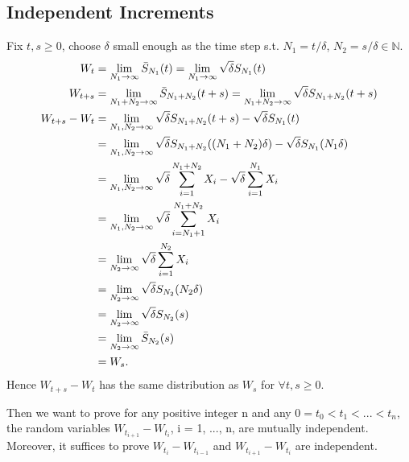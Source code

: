 \subsection{Independent Increments}
Fix $ t,s \geq 0$, choose $\delta$ small enough as the time step s.t. $N_1=t/\delta$, $N_2=s/\delta\in \mathbb{N}$.
\begin{align}
   W_t&=\lim_{N_1\rightarrow \infty} \bar{S}_{N_1}(t)=\lim_{N_1\rightarrow \infty} \sqrt{\delta} S_{N_1}(t)\\
   W_{t+s}&=\lim_{N_1+N_2\rightarrow \infty} \bar{S}_{N_1+N_2}(t+s)=\lim_{N_1+N_2\rightarrow \infty} \sqrt{\delta} S_{N_1+N_2}(t+s)\\
   W_{t+s}-W_t&=\lim_{N_1,N_2\rightarrow \infty} \sqrt{\delta} S_{N_1+N_2}(t+s)-\sqrt{\delta} S_{N_1}(t)\\\notag
   &=\lim_{N_1,N_2\rightarrow \infty} \sqrt{\delta} S_{N_1+N_2}((N_1+N_2)\delta)-\sqrt{\delta} S_{N_1}(N_1\delta)\\\notag
   &=\lim_{N_1,N_2\rightarrow \infty} \sqrt{\delta} \sum_{i=1}^{N_1+N_2} X_i-\sqrt{\delta} \sum_{i=1}^{N_1} X_i\\\notag
   &=\lim_{N_1,N_2\rightarrow \infty} \sqrt{\delta} \sum_{i=N_1+1}^{N_1+N_2} X_i\\\notag
   &=\lim_{N_2\rightarrow \infty} \sqrt{\delta} \sum_{i=1}^{N_2} X_i\\\notag
   &=\lim_{N_2\rightarrow \infty} \sqrt{\delta} S_{N_2}(N_2\delta)\\\notag\
   &=\lim_{N_2\rightarrow \infty} \sqrt{\delta} S_{N_2}(s)\\\notag
   &=\lim_{N_2\rightarrow \infty} \bar{S}_{N_2}(s)\\\notag
   &=W_s.
\end{align}
Hence $W_{t+s}-W_t$  has the same distribution as $W_s$ for $\forall t,s \geq 0$.

Then we want to prove for any positive integer n and any $0 = t_0 < t_1 <...< t_n$, the random variables $W_{t_{i+1}} - W_{t_{i}}$, i = 1, ..., n, are mutually independent. Moreover, it suffices to prove $W_{t_{i}}-W_{t_{i-1}}$ and $W_{t_{i+1}}-W_{t_{i}}$ are independent.

